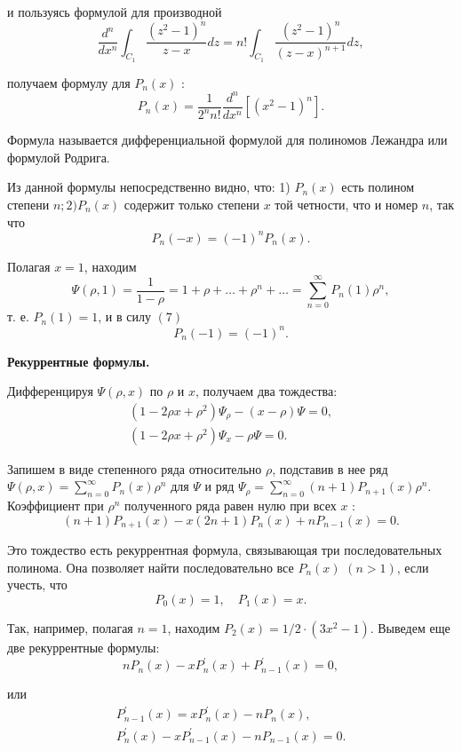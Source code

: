 и пользуясь формулой для производной
\[
\frac{d^{n}}{d x^{n}} \int_{C_{1}} \frac{\left(z^{2}-1\right)^{n}}{z-x} d z=n ! \int_{C_{1}} \frac{\left(z^{2}-1\right)^{n}}{(z-x)^{n+1}} d z,
\]

получаем формулу для $P_{n}(x)$ :
\[
P_{n}(x)=\frac{1}{2^{n} n !} \frac{d^{n}}{d x^{n}}\left[\left(x^{2}-1\right)^{n}\right] .
\]

Формула называется дифференциальной формулой для полиномов Лежандра или формулой Родрига.

Из данной формулы непосредственно видно, что: 1) $P_{n}(x)$ есть полином степени $n ; 2) P_{n}(x)$ содержит только степени $x$ той четности, что и номер $n$, так что
\[
P_{n}(-x)=(-1)^{n} P_{n}(x) .
\]

Полагая $x=1$, находим
\[
\Psi(\rho, 1)=\frac{1}{1-\rho}=1+\rho+\ldots+\rho^{n}+\ldots=\sum_{n=0}^{\infty} P_{n}(1) \rho^{n},
\]
т. е. $P_{n}(1)=1$, и в силу $(7)$
\[
P_{n}(-1)=(-1)^{n} .
\]


\textbf{Рекуррентные формулы. }

Дифференцируя $\Psi(\rho, x)$ по $\rho$ и $x$, получаем два тождества:
\[
\begin{aligned}
	\left(1-2 \rho x+\rho^{2}\right) \Psi_{\rho}-(x-\rho) \Psi=0, \\
	\left(1-2 \rho x+\rho^{2}\right) \Psi_{x}-\rho \Psi=0 .
\end{aligned}
\]

Запишем в виде степенного ряда относительно $\rho$, подставив в нее ряд $\Psi(\rho, x)=\sum_{n=0}^{\infty} P_{n}(x) \rho^{n}$ для $\Psi$ и ряд $\Psi_{\rho}=\sum_{n=0}^{\infty}(n+1) P_{n+1}(x) \rho^{n}$.
Коэффициент при $\rho^{n}$ полученного ряда равен нулю при всех $x$ :
\[
(n+1) P_{n+1}(x)-x(2 n+1) P_{n}(x)+n P_{n-1}(x)=0 .
\]

Это тождество есть рекуррентная формула, связывающая три последовательных полинома. Она позволяет найти последовательно все $P_{n}(x)$ $(n>1)$, если учесть, что
\[
P_{0}(x)=1, \quad P_{1}(x)=x .
\]

Так, например, полагая $n=1$, находим $P_{2}(x)=1 / 2 \cdot\left(3 x^{2}-1\right)$.
Выведем еще две рекуррентные формулы:
\[
n P_{n}(x)-x P_{n}^{\prime}(x)+P_{n-1}^{\prime}(x)=0,
\]

или
\[
\begin{array}{c}
	P_{n-1}^{\prime}(x)=x P_{n}^{\prime}(x)-n P_{n}(x), \\
	P_{n}^{\prime}(x)-x P_{n-1}^{\prime}(x)-n P_{n-1}(x)=0 .
\end{array}
\]


